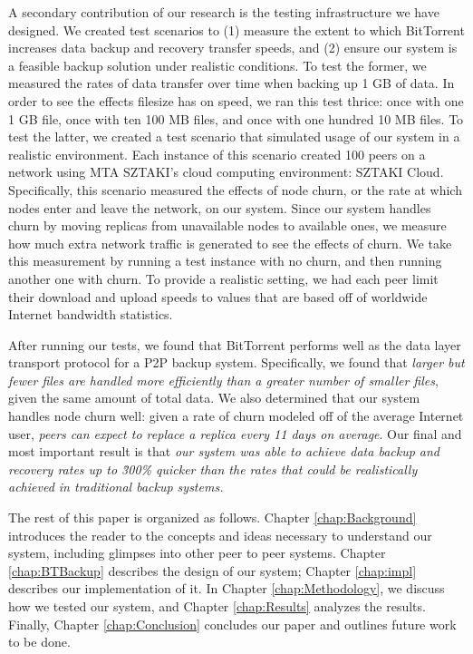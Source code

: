 \documentclass[12pt]{report}
\begin{document}
A secondary contribution of our research is the testing infrastructure we have designed. We created test scenarios to (1) measure the extent to which BitTorrent increases data backup and recovery transfer speeds, and (2) ensure our system is a feasible backup solution under realistic conditions. To test the former, we measured the rates of data transfer over time when backing up 1 GB of data. In order to see the effects filesize has on speed, we ran this test thrice: once with one 1 GB file, once with ten 100 MB files, and once with one hundred 10 MB files. To test the latter, we created a test scenario that simulated usage of our system in a realistic environment. Each instance of this scenario created 100 peers on a network using MTA SZTAKI's cloud computing environment: SZTAKI Cloud. Specifically, this scenario measured the effects of node churn, or the rate at which nodes enter and leave the network, on our system. Since our system handles churn by moving replicas from unavailable nodes to available ones, we measure how much extra network traffic is generated to see the effects of churn. We take this measurement by running a test instance with no churn, and then running another one with churn. To provide a realistic setting, we had each peer limit their download and upload speeds to values that are based off of worldwide Internet bandwidth statistics.

After running our tests, we found that BitTorrent performs well as the data layer transport protocol for a P2P backup system. Specifically, we found that \emph{larger but fewer files are handled more efficiently than a greater number of smaller files}, given the same amount of total data. We also determined that our system handles node churn well: given a rate of churn modeled off of the average Internet user, \emph{peers can expect to replace a replica every 11 days on average}. Our final and most important result is that \emph{our system was able to achieve data backup and recovery rates up to \~300\% quicker than the rates that could be realistically achieved in traditional backup systems.}

The rest of this paper is organized as follows. Chapter \ref{chap:Background} introduces the reader to the concepts and ideas necessary to understand our system, including glimpses into other peer to peer systems. Chapter \ref{chap:BTBackup} describes the design of our system; Chapter \ref{chap:impl} describes our implementation of it. In Chapter \ref{chap:Methodology}, we discuss how we tested our system, and Chapter \ref{chap:Results} analyzes the results. Finally, Chapter \ref{chap:Conclusion} concludes our paper and outlines future work to be done.
\end{document}
